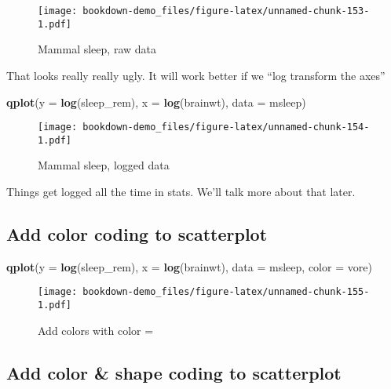 \documentclass[]{book}
\newenvironment{Shaded}{\begin{snugshade}}{\end{snugshade}}
\newcommand{\KeywordTok}[1]{\textcolor[rgb]{0.13,0.29,0.53}{\textbf{#1}}}
\newcommand{\DataTypeTok}[1]{\textcolor[rgb]{0.13,0.29,0.53}{#1}}
\newcommand{\NormalTok}[1]{#1}
\theoremstyle{definition}
\theoremstyle{definition}
\theoremstyle{definition}
\theoremstyle{remark}
\begin{document}
\begin{figure}
\centering
\texttt{[image: bookdown-demo\_files/figure-latex/unnamed-chunk-153-1.pdf]}
\caption{\label{fig:unnamed-chunk-153}Mammal sleep, raw data}
\end{figure}

That looks really really ugly. It will work better if we ``log transform
the axes''

\begin{Shaded}
\begin{Highlighting}[]
\KeywordTok{qplot}\NormalTok{(}\DataTypeTok{y =} \KeywordTok{log}\NormalTok{(sleep_rem),}
      \DataTypeTok{x =} \KeywordTok{log}\NormalTok{(brainwt), }
      \DataTypeTok{data =}\NormalTok{ msleep)}
\end{Highlighting}
\end{Shaded}

\begin{figure}
\centering
\texttt{[image: bookdown-demo\_files/figure-latex/unnamed-chunk-154-1.pdf]}
\caption{\label{fig:unnamed-chunk-154}Mammal sleep, logged data}
\end{figure}

Things get logged all the time in stats. We'll talk more about that
later.

\subsection{Add color coding to
scatterplot}\label{add-color-coding-to-scatterplot}

\begin{Shaded}
\begin{Highlighting}[]
\KeywordTok{qplot}\NormalTok{(}\DataTypeTok{y =} \KeywordTok{log}\NormalTok{(sleep_rem),}
      \DataTypeTok{x =} \KeywordTok{log}\NormalTok{(brainwt), }
      \DataTypeTok{data =}\NormalTok{ msleep,}
      \DataTypeTok{color =}\NormalTok{ vore)}
\end{Highlighting}
\end{Shaded}

\begin{figure}
\centering
\texttt{[image: bookdown-demo\_files/figure-latex/unnamed-chunk-155-1.pdf]}
\caption{\label{fig:unnamed-chunk-155}Add colors with color =}
\end{figure}

\subsection{Add color \& shape coding to
scatterplot}\label{add-color-shape-coding-to-scatterplot}
\end{document}
